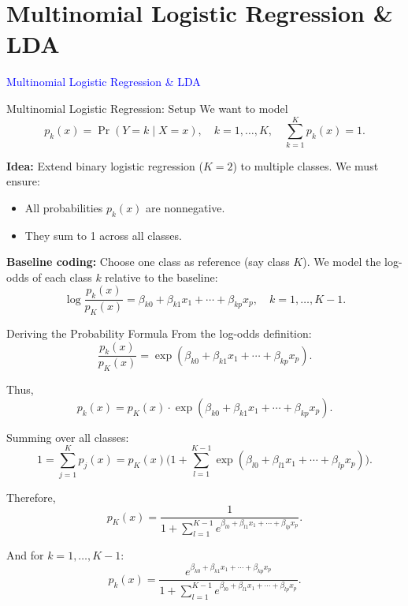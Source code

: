 \documentclass[../../generative_classifiers.tex]{subfiles}
\begin{document}
\graphicspath{{figures/}{lectures/04_multinomial_lda/figures/}}
\section{Multinomial Logistic Regression \& LDA}
\begin{frame}[plain]
  \vfill\begin{center}{\Huge \textcolor{blue}{Multinomial Logistic Regression \& LDA}}\end{center}\vfill
\end{frame}



\begin{frame}{Multinomial Logistic Regression: Setup}
\small
We want to model
\[
p_k(x) = \Pr(Y=k \mid X=x), \quad k=1,\dots,K, \quad \sum_{k=1}^K p_k(x) = 1.
\]

\textbf{Idea:} Extend binary logistic regression ($K=2$) to multiple classes.  
We must ensure:
\begin{itemize}
    \item All probabilities $p_k(x)$ are nonnegative.
    \item They sum to 1 across all classes.
\end{itemize}

\textbf{Baseline coding:} Choose one class as reference (say class $K$).  
We model the log-odds of each class $k$ relative to the baseline:
\[
\log \frac{p_k(x)}{p_K(x)} = \beta_{k0} + \beta_{k1}x_1 + \cdots + \beta_{kp}x_p,
\quad k=1,\dots,K-1.
\]
\end{frame}

\begin{frame}{Deriving the Probability Formula}
\small
From the log-odds definition:
\[
\frac{p_k(x)}{p_K(x)} = \exp(\beta_{k0} + \beta_{k1}x_1 + \cdots + \beta_{kp}x_p).
\]

Thus,
\[
p_k(x) = p_K(x) \cdot \exp(\beta_{k0} + \beta_{k1}x_1 + \cdots + \beta_{kp}x_p).
\]

Summing over all classes:
\[
1 = \sum_{j=1}^K p_j(x) 
= p_K(x) \Big( 1 + \sum_{l=1}^{K-1} \exp(\beta_{l0} + \beta_{l1}x_1 + \cdots + \beta_{lp}x_p) \Big).
\]

Therefore,
\[
p_K(x) = \frac{1}{1 + \sum_{l=1}^{K-1} e^{\beta_{l0} + \beta_{l1}x_1 + \cdots + \beta_{lp}x_p}}.
\]

And for $k=1,\dots,K-1$:
\[
p_k(x) = \frac{e^{\beta_{k0} + \beta_{k1}x_1 + \cdots + \beta_{kp}x_p}}{1 + \sum_{l=1}^{K-1} e^{\beta_{l0} + \beta_{l1}x_1 + \cdots + \beta_{lp}x_p}}.
\]
\end{frame}
\end{document}
